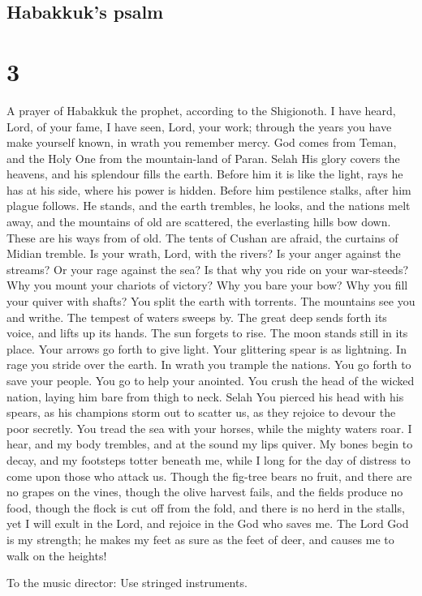 \hypertarget{habakkuks-psalm}{%
\subsection{Habakkuk's psalm}\label{habakkuks-psalm}}

\hypertarget{section-1}{%
\section{3}\label{section-1}}

 A prayer of Habakkuk the prophet, according to the
Shigionoth.  I have heard, Lord, of your fame, I have seen,
Lord, your work; through the years you have make yourself known, in
wrath you remember mercy.  God comes from Teman, and the
Holy One from the mountain-land of Paran. Selah His glory covers the
heavens, and his splendour fills the earth.  Before him it
is like the light, rays he has at his side, where his power is hidden.
 Before him pestilence stalks, after him plague follows.
 He stands, and the earth trembles, he looks, and the
nations melt away, and the mountains of old are scattered, the
everlasting hills bow down. These are his ways from of old. 
The tents of Cushan are afraid, the curtains of Midian tremble.
 Is your wrath, Lord, with the rivers? Is your anger against
the streams? Or your rage against the sea? Is that why you ride on your
war-steeds? Why you mount your chariots of victory?  Why you
bare your bow? Why you fill your quiver with shafts? You split the earth
with torrents.  The mountains see you and writhe. The
tempest of waters sweeps by. The great deep sends forth its voice, and
lifts up its hands.  The sun forgets to rise. The moon
stands still in its place. Your arrows go forth to give light. Your
glittering spear is as lightning.  In rage you stride over
the earth. In wrath you trample the nations.  You go forth
to save your people. You go to help your anointed. You crush the head of
the wicked nation, laying him bare from thigh to neck. Selah
 You pierced his head with his spears, as his champions
storm out to scatter us, as they rejoice to devour the poor secretly.
 You tread the sea with your horses, while the mighty
waters roar.  I hear, and my body trembles, and at the
sound my lips quiver. My bones begin to decay, and my footsteps totter
beneath me, while I long for the day of distress to come upon those who
attack us.  Though the fig-tree bears no fruit, and there
are no grapes on the vines, though the olive harvest fails, and the
fields produce no food, though the flock is cut off from the fold, and
there is no herd in the stalls,  yet I will exult in the
Lord, and rejoice in the God who saves me.  The Lord God is
my strength; he makes my feet as sure as the feet of deer, and causes me
to walk on the heights!

To the music director: Use stringed instruments.
